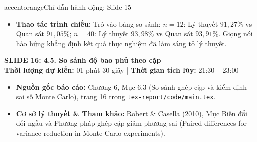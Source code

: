 \documentclass[10pt,a4paper]{article}
\newcommand{\slideheader}[4]{
    \vspace{0.4cm}
    \begin{tcolorbox}[colback=primary!7!white, colframe=primary, arc=2mm, boxrule=1pt, left=4mm, right=4mm, top=2.5mm, bottom=2.5mm]
        {\Large\bfseries\color{primary} SLIDE #1: #2}\\[0.1cm]
        {\small\textbf{Thời lượng dự kiến:} #3 \quad | \quad \textbf{Thời gian tích lũy:} #4}
    \end{tcolorbox}
    \vspace{0.15cm}
}
\begin{document}
\begin{actionbox}{accentorange}{Chỉ dẫn hành động: Slide 15}
    \begin{itemize}
        \item \textbf{Thao tác trình chiếu:} Trỏ vào bảng so sánh: $n=12$: Lý thuyết $91{,}27\%$ vs Quan sát $91{,}05\%$; $n=40$: Lý thuyết $93{,}98\%$ vs Quan sát $93{,}91\%$. Giọng nói hào hứng khẳng định kết quả thực nghiệm đã làm sáng tỏ lý thuyết.
    \end{itemize}
\end{actionbox}

\newpage

\slideheader{16}{4.5. So sánh độ bao phủ theo cặp}{01 phút 30 giây}{21:30 -- 23:00}

\begin{itemize}
    \item \textbf{Nguồn gốc báo cáo:} Chương 6, Mục 6.3 (So sánh ghép cặp và kiểm định sai số Monte Carlo), trang 16 trong \texttt{tex-report/code/main.tex}.
    \item \textbf{Cơ sở lý thuyết \& Tham khảo:} Robert \& Casella (2010), Mục Biến đổi đối ngẫu và Phương pháp ghép cặp giảm phương sai (Paired differences for variance reduction in Monte Carlo experiments).
\end{itemize}
\end{document}
